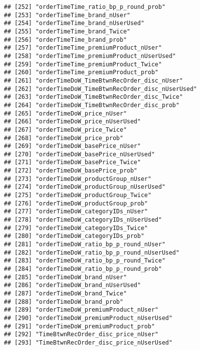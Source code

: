 \documentclass[10pt]{report}
\begin{document}
\begin{verbatim}
## [252] "orderTimeTime_ratio_bp_p_round_prob"                
## [253] "orderTimeTime_brand_nUser"                          
## [254] "orderTimeTime_brand_nUserUsed"                      
## [255] "orderTimeTime_brand_Twice"                          
## [256] "orderTimeTime_brand_prob"                           
## [257] "orderTimeTime_premiumProduct_nUser"                 
## [258] "orderTimeTime_premiumProduct_nUserUsed"             
## [259] "orderTimeTime_premiumProduct_Twice"                 
## [260] "orderTimeTime_premiumProduct_prob"                  
## [261] "orderTimeDoW_TimeBtwnRecOrder_disc_nUser"           
## [262] "orderTimeDoW_TimeBtwnRecOrder_disc_nUserUsed"       
## [263] "orderTimeDoW_TimeBtwnRecOrder_disc_Twice"           
## [264] "orderTimeDoW_TimeBtwnRecOrder_disc_prob"            
## [265] "orderTimeDoW_price_nUser"                           
## [266] "orderTimeDoW_price_nUserUsed"                       
## [267] "orderTimeDoW_price_Twice"                           
## [268] "orderTimeDoW_price_prob"                            
## [269] "orderTimeDoW_basePrice_nUser"                       
## [270] "orderTimeDoW_basePrice_nUserUsed"                   
## [271] "orderTimeDoW_basePrice_Twice"                       
## [272] "orderTimeDoW_basePrice_prob"                        
## [273] "orderTimeDoW_productGroup_nUser"                    
## [274] "orderTimeDoW_productGroup_nUserUsed"                
## [275] "orderTimeDoW_productGroup_Twice"                    
## [276] "orderTimeDoW_productGroup_prob"                     
## [277] "orderTimeDoW_categoryIDs_nUser"                     
## [278] "orderTimeDoW_categoryIDs_nUserUsed"                 
## [279] "orderTimeDoW_categoryIDs_Twice"                     
## [280] "orderTimeDoW_categoryIDs_prob"                      
## [281] "orderTimeDoW_ratio_bp_p_round_nUser"                
## [282] "orderTimeDoW_ratio_bp_p_round_nUserUsed"            
## [283] "orderTimeDoW_ratio_bp_p_round_Twice"                
## [284] "orderTimeDoW_ratio_bp_p_round_prob"                 
## [285] "orderTimeDoW_brand_nUser"                           
## [286] "orderTimeDoW_brand_nUserUsed"                       
## [287] "orderTimeDoW_brand_Twice"                           
## [288] "orderTimeDoW_brand_prob"                            
## [289] "orderTimeDoW_premiumProduct_nUser"                  
## [290] "orderTimeDoW_premiumProduct_nUserUsed"              
## [291] "orderTimeDoW_premiumProduct_prob"                   
## [292] "TimeBtwnRecOrder_disc_price_nUser"                  
## [293] "TimeBtwnRecOrder_disc_price_nUserUsed"              

\end{verbatim}
\end{document}

